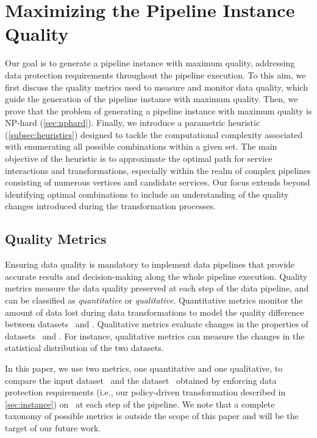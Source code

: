 \section{Maximizing the Pipeline Instance Quality}\label{sec:heuristics}
Our goal is to generate a pipeline instance with maximum quality, addressing data protection requirements throughout the pipeline execution. To this aim, we first discuss the quality metrics used to measure and monitor data quality, which guide the generation of the pipeline instance with maximum quality. Then, we prove that the problem of generating a pipeline instance with maximum quality is NP-hard (\cref{sec:nphard}). Finally, we introduce a parametric heuristic (\cref{subsec:heuristics}) designed to tackle the computational complexity associated with enumerating all possible combinations within a given set. The main objective of the heuristic is to approximate the optimal path for service interactions and transformations, especially within the realm of complex pipelines consisting of numerous vertices and candidate services. Our focus extends beyond identifying optimal combinations to include an understanding of the quality changes introduced during the transformation processes.

\subsection{Quality Metrics}\label{subsec:metrics}
Ensuring data quality is mandatory to implement data pipelines that provide accurate results and decision-making along the whole pipeline execution. Quality metrics measure the data quality preserved at each step of the data pipeline, and can be classified as \emph{quantitative} or \emph{qualitative}. 
Quantitative metrics monitor the amount of data lost during data transformations to model the quality difference between datasets \origdataset\ and \transdataset.
Qualitative metrics evaluate changes in the properties of datasets \origdataset\ and \transdataset. For instance, qualitative metrics can measure the changes in the statistical distribution of the two datasets.

In this paper, we use two metrics, one quantitative and one qualitative, to compare the input dataset \origdataset\ and the dataset \transdataset\ obtained by enforcing data protection requirements (i.e., our policy-driven transformation described in \cref{sec:instance}) on \origdataset\ at each step of the pipeline. We note that a complete taxonomy of possible metrics is outside the scope of this paper and will be the target of our future work.

